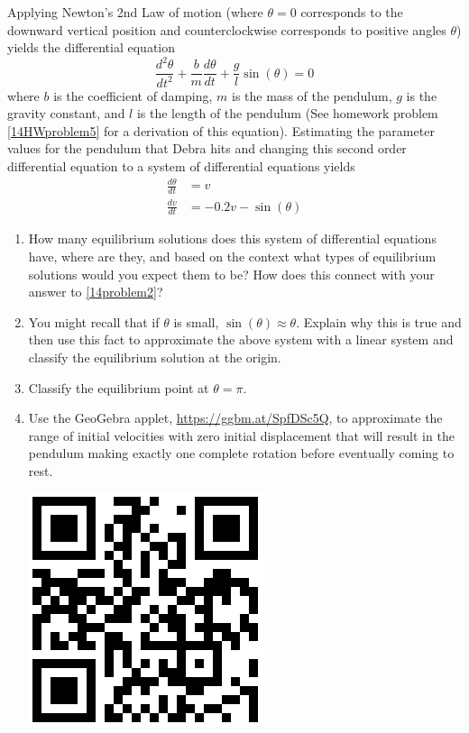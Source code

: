 Applying Newton's 2nd Law of motion (where $\theta = 0$ corresponds to the downward vertical position and counterclockwise corresponds to positive angles $\theta$) yields the differential equation
\[
\frac{d^2\theta}{dt^2}+\frac{b}{m}\frac{d\theta}{dt}+\frac{g}{l}\sin(\theta)=0
\]
where $b$ is the coefficient of damping, $m$ is the mass of the pendulum, $g$ is the gravity constant, and $l$ is the length of the pendulum (See homework problem \ref{14HWproblem5} for a derivation of this equation). Estimating the parameter values for the pendulum that Debra hits and changing this second order differential equation to a system of differential equations yields
\begin{align*}
\frac{d\theta}{dt} &=v \\
\frac{dv}{dt} &=-0.2v-\sin(\theta)
\end{align*}

\begin{enumerate}[resume]

\item How many equilibrium solutions does this system of differential equations have, where are they, and based on the context what types of equilibrium solutions would you expect them to be?  How does this connect with your answer to \ref{14problem2}? \label{14problem3} \vfill

\item You might recall that if $\theta$ is small, $\sin(\theta) \approx \theta$. Explain why this is true and then use this fact to approximate the above system with a linear system and classify the equilibrium solution at the origin. \label{14problem4} \vfill

\item Classify the equilibrium point at $\theta=\pi$. \label{14problem5} \vfill

\item Use the GeoGebra applet, \href{https://ggbm.at/SpfDSc5Q}{\underline{https://ggbm.at/SpfDSc5Q}}, to approximate the range of initial velocities with zero initial displacement that will result in the pendulum making exactly one complete rotation before eventually coming to rest. \label{14problem6}

\vspace{-.4in}\hspace{-.6in}\includegraphics[width=.5in]{14/14PendulumQR.png}
\vfill
\end{enumerate}
\clearpage

